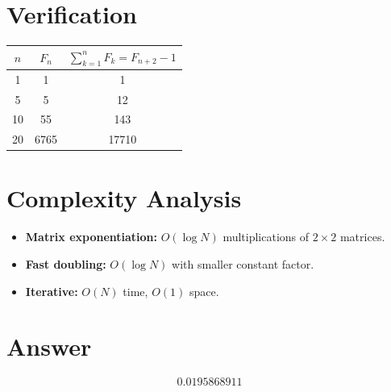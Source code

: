 \documentclass[11pt]{article}
\begin{document}
\section{Verification}

\begin{center}
\begin{tabular}{ccc}
\toprule
$n$ & $F_n$ & $\sum_{k=1}^n F_k = F_{n+2}-1$ \\
\midrule
1  & 1    & 1 \\
5  & 5    & 12 \\
10 & 55   & 143 \\
20 & 6765 & 17710 \\
\bottomrule
\end{tabular}
\end{center}

\section{Complexity Analysis}

\begin{itemize}
\item \textbf{Matrix exponentiation:} $O(\log N)$ multiplications of $2 \times 2$ matrices.
\item \textbf{Fast doubling:} $O(\log N)$ with smaller constant factor.
\item \textbf{Iterative:} $O(N)$ time, $O(1)$ space.
\end{itemize}

\section{Answer}

\[
\boxed{0.0195868911}
\]
\end{document}
